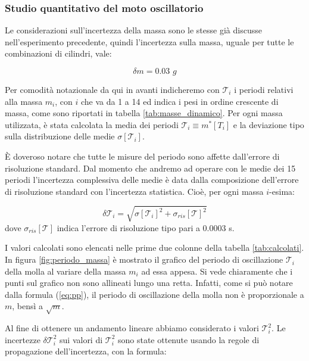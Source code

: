 \subsubsection{Studio quantitativo del moto oscillatorio}

Le considerazioni sull'incertezza della massa sono le stesse già discusse nell'esperimento precedente,
quindi l'incertezza sulla massa, uguale per tutte le combinazioni di cilindri, vale:

\begin{equation*}
    \delta m = 0.03 \,\, g
\end{equation*}

Per comodità notazionale da qui in avanti indicheremo con $\mathcal{T}_i$ i periodi relativi alla massa $m_i$, con $i$ che va da 1 a 14 ed
indica i pesi in ordine crescente di massa, come sono riportati in tabella \ref{tab:masse_dinamico}.
Per ogni massa utilizzata, è stata calcolata la media dei periodi $\mathcal{T}_i \equiv m^*[T_i]$ e la deviazione tipo sulla distribuzione
delle medie $\sigma[\mathcal{T}_i]$.

È doveroso notare che tutte le misure del periodo sono affette dall'errore di risoluzione standard.
Dal momento che andremo ad operare con le medie dei 15 periodi l'incertezza complessiva delle medie è data dalla composizione
dell'errore di risoluzione standard con l'incertezza statistica. Cioè, per ogni massa $i$-esima:

\begin{equation*}
    \delta \mathcal{T}_i = \sqrt{\sigma[\mathcal{T}_i]^2 + \sigma_{ris}[\mathcal{T}]^2}
\end{equation*}
%
dove $\sigma_{ris}[\mathcal{T}]$ indica l'errore di risoluzione tipo pari a 0.0003 s.

I valori calcolati sono elencati nelle prime
due colonne della tabella \ref{tab:calcolati}.
In figura \ref{fig:periodo_massa} è mostrato il grafico del periodo di oscillazione $\mathcal{T}_i$ della molla al variare della massa $m_i$ ad essa appesa. Si vede chiaramente
che i punti sul grafico non sono allineati lungo una retta. Infatti, come si può notare dalla formula (\ref{eq:pp}),
il periodo di oscillazione della molla non è proporzionale a $m$, bensì a $\sqrt{m}$.

Al fine di ottenere un andamento lineare abbiamo considerato i valori $\mathcal{T}_i^2$. Le incertezze $\delta \mathcal{T}_i^2$
sui valori di $\mathcal{T}_i^2$ sono state ottenute usando la regole di propagazione dell'incertezza, con la formula:

